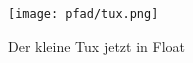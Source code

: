 \documentclass{article}
\begin{document}
\begin{figure}[H]
\begin{center}
	\texttt{[image: pfad/tux.png]}
\caption{Der kleine Tux jetzt in Float}
\label{img:kleinertux-float}
\end{center}
\end{figure}
\end{document}
